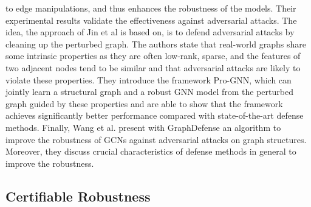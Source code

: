 \documentclass[a4paper,preprint]{sig-alternate}
\begin{document}
to edge manipulations, and thus enhances the robustness of the models. Their experimental results validate the effectiveness 
against adversarial attacks.
The idea, the approach of Jin et al \cite{Jin_2020_Graph} is based on, is to defend adversarial attacks by cleaning up the perturbed graph.
The authors state that real-world graphs share some intrinsic properties as they are often low-rank, sparse, and the features of two adjacent
nodes tend to be similar and that adversarial attacks are likely to violate these properties.
They introduce the framework Pro-GNN, which can jointly learn a structural graph and a robust GNN model from the perturbed graph guided by
these properties and are able to show that the framework achieves significantly better performance compared with state-of-the-art 
defense methods.
Finally, Wang et al. \cite{Wang_2019} present with GraphDefense an algorithm to improve the robustness of GCNs
against adversarial attacks on graph structures. Moreover, they discuss crucial characteristics of defense methods in general to improve 
the robustness.

\subsection{Certifiable Robustness}
\label{sec:rev3}
\end{document}
